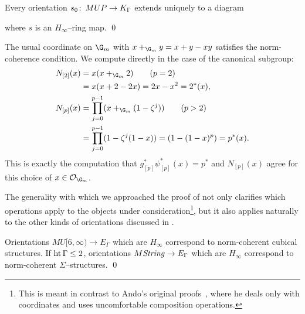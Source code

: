 \begin{corollary}\label{AHSHinftyResultForEthy}
Every orientation \(s_0\colon\thinspace MUP \to K_\Gamma\) extends uniquely to a diagram
\begin{center}
\end{center}
where \(s\) is an \(H_\infty\)--ring map. \qed
\end{corollary}

\begin{example}
The usual coordinate on \(\G_m\) with \(x +_{\G_m} y = x + y - xy\) satisfies the norm-coherence condition.  We compute directly in the case of the canonical subgroup:
\begin{align*}
N_{[2]}(x) & = x(x +_{\G_m} 2) \tag{\(p = 2\)} \\
& = x (x + 2 - 2x) = 2x - x^2 = 2^*(x), \\
N_{[p]}(x) & = \prod_{j=0}^{p-1} (x +_{\G_m} (1 - \zeta^j)) \tag{\(p > 2\)} \\
& = \prod_{j=0}^{p-1} (1 - \zeta^j(1 - x)) = (1 - (1 - x)^p) = p^*(x).
\end{align*}
This is exactly the computation that \(g_{[p]}^* \psi_{[p]}^*(x) = p^*\) and \(N_{[p]}(x)\) agree for this choice of \(x \in \sheaf O_{\G_m}\).
\end{example}

The generality with which we approached the proof of  not only clarifies which operations apply to the objects under consideration\footnote{This is meant in contrast to Ando's original proofs~\cite[Section 2.6]{Ando}, where he deals only with coordinates and uses uncomfortable composition operations.}, but it also applies naturally to the other kinds of orientations discussed in .

\begin{theorem}
Orientations \(MU[6, \infty) \to E_\Gamma\) which are \(H_\infty\) correspond to norm-coherent cubical structures.  If \(\operatorname{ht}{\Gamma} \le 2\), orientations \(M\mathit{String} \to E_\Gamma\) which are \(H_\infty\) correspond to norm-coherent \(\Sigma\)--structures. \qed
\end{theorem}

